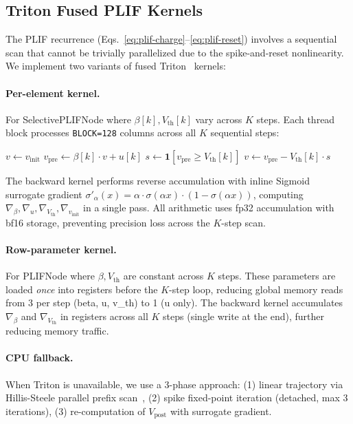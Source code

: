 \documentclass[10pt,twocolumn]{article}
\newcommand{\vpost}{V_{\text{post}}}
\newcommand{\vth}{V_{\text{th}}}
\begin{document}
\subsection{Triton Fused PLIF Kernels}
\label{sec:triton}

The PLIF recurrence (Eqs.~\ref{eq:plif-charge}--\ref{eq:plif-reset}) involves a sequential scan that cannot be trivially parallelized due to the spike-and-reset nonlinearity.
We implement two variants of fused Triton~\citep{tillet2019triton} kernels:

\paragraph{Per-element kernel.}
For SelectivePLIFNode where $\beta[k], \vth[k]$ vary across $K$ steps.
Each thread block processes \texttt{BLOCK=128} columns across all $K$ sequential steps:
\begin{algorithmic}
\STATE $v \leftarrow v_{\text{init}}$
    \STATE $v_{\text{pre}} \leftarrow \beta[k] \cdot v + u[k]$ 
    \STATE $s \leftarrow \mathbf{1}[v_{\text{pre}} \geq \vth[k]]$ 
    \STATE $v \leftarrow v_{\text{pre}} - \vth[k] \cdot s$ 
\ENDFOR
\end{algorithmic}
The backward kernel performs reverse accumulation with inline Sigmoid surrogate gradient $\sigma'_\alpha(x) = \alpha \cdot \sigma(\alpha x) \cdot (1 - \sigma(\alpha x))$, computing $\nabla_\beta, \nabla_u, \nabla_{\vth}, \nabla_{v_{\text{init}}}$ in a single pass.
All arithmetic uses fp32 accumulation with bf16 storage, preventing precision loss across the $K$-step scan.

\paragraph{Row-parameter kernel.}
For PLIFNode where $\beta, \vth$ are constant across $K$ steps.
These parameters are loaded \emph{once} into registers before the $K$-step loop, reducing global memory reads from 3 per step (beta, u, v\_th) to 1 (u only).
The backward kernel accumulates $\nabla_\beta$ and $\nabla_{\vth}$ in registers across all $K$ steps (single write at the end), further reducing memory traffic.

\paragraph{CPU fallback.}
When Triton is unavailable, we use a 3-phase approach: (1) linear trajectory via Hillis-Steele parallel prefix scan~\citep{blelloch1990prefix, martin2018parallelizing}, (2) spike fixed-point iteration (detached, max 3 iterations), (3) re-computation of $\vpost$ with surrogate gradient.
\end{document}
